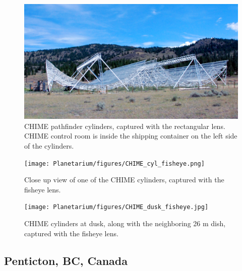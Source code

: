 \begin{figure}[htb]
\begin{center}
\includegraphics[width=0.95\linewidth]{Planetarium/figures/CHIME_cylinders.jpg}
\caption{CHIME pathfinder cylinders, captured with the rectangular lens. CHIME control room is inside the shipping container on the left side of the cylinders.}
\label{Fig:CHIME_cyl}
\end{center}
\end{figure}

\begin{figure}[htb]
\centering
\begin{minipage}[b]{0.47\textwidth}
\centering
\texttt{[image: Planetarium/figures/CHIME\_cyl\_fisheye.png]}
\caption{Close up view of one of the CHIME cylinders, captured with the fisheye lens.}
\label{Fig:CHIME_cyl_fisheye}
\end{minipage}%
\begin{minipage}[b]{0.02\textwidth}
\hspace{1cm}
\end{minipage}%
\begin{minipage}[b]{0.47\textwidth}
\centering
\texttt{[image: Planetarium/figures/CHIME\_dusk\_fisheye.jpg]}
\caption{CHIME cylinders at dusk, along with the neighboring 26 m dish, captured with the fisheye lens.}
\label{Fig:CHIME_dusk_fisheye}
\end{minipage}
\end{figure}


\subsection{Penticton, BC, Canada}

